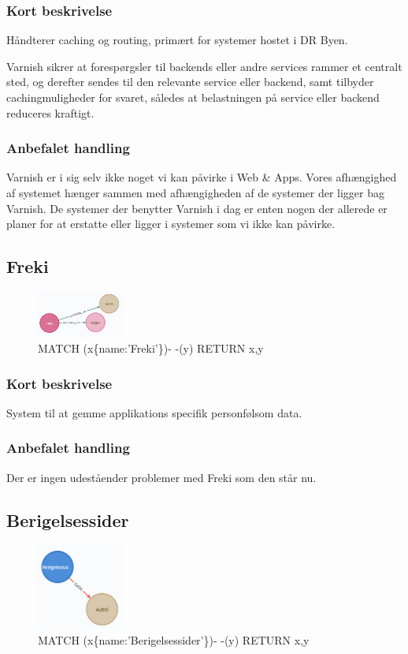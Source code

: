 \documentclass{article}
\begin{document}
\subsubsection*{Kort beskrivelse}
Håndterer caching og routing, primært for systemer hostet i DR Byen.

Varnish sikrer at forespørgsler til backends eller andre services rammer et centralt sted, og derefter sendes til den relevante service eller backend, samt tilbyder cachingmuligheder for svaret, således at belastningen på service eller backend reduceres kraftigt.
\subsubsection*{Anbefalet handling}
Varnish er i sig selv ikke noget vi kan påvirke i Web \& Apps. Vores afhængighed af systemet hænger sammen med afhængigheden af de systemer der ligger bag Varnish. 
De systemer der benytter Varnish i dag er enten nogen der allerede er planer for at erstatte eller ligger i systemer som vi ikke kan påvirke.


\subsection{Freki}
\begin{figure}[h]
\includegraphics[width=80pt]{Freki.PNG}
\caption{MATCH (x\{name:'Freki'\})- -(y) RETURN x,y}
\end{figure}
\subsubsection*{Kort beskrivelse}
System til at gemme applikations specifik personfølsom data.
\subsubsection*{Anbefalet handling}
Der er ingen udeståender problemer med Freki som den står nu.



\subsection{Berigelsessider}
\begin{figure}[h]
\includegraphics[width=80pt]{Berigelsessider.PNG}
\caption{MATCH (x\{name:'Berigelsessider'\})- -(y) RETURN x,y}
\end{figure}
\end{document}
